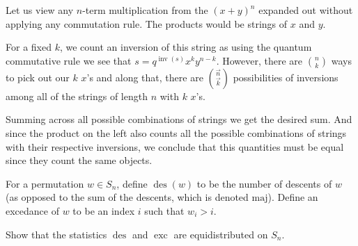 \documentclass[12pt]{memoir}
\DeclareMathOperator{\des}{des}
\DeclareMathOperator{\inv}{inv}
\DeclareMathOperator{\exc}{exc}
\begin{document}
\begin{ptcbr}
    Let us view any $n$-term multiplication from the $(x+y)^n$ expanded out without applying any commutation rule. The products would be strings of $x$ and $y$.\par
    For a fixed $k$, we count an inversion of this string as using the quantum commutative rule we see that $s=q^{\inv(s)}x^ky^{n-k}$. However, there are $\binom{n}{k}$ ways to pick out our $k$ $x$'s and along that, there are $\binom{\vec{n}}{\vec{k}}$ possibilities of inversions among all of the strings of length $n$ with $k$ $x$'s.\par 
    Summing across all possible combinations of strings we get the desired sum. And since the product on the left also counts all the possible combinations of strings with their respective inversions, we conclude that this quantities must be equal since they count the same objects.

    \iffalse
    By induction once again, when $n=1$ we get 
    $$x+y=(1)(1)y+(1)x(1)=y+x.$$
    Now let us assume that the identity is valid up to $n-1$, then 
    \begin{align*}
        (x+y)^n&=\left(\sum_{k=0}^{n-1}\binom{\vec{n-1}}{\vec k}x^ky^{(n-1)-k}\right)(x+y)\\
        &=\sum_{k=0}^{n-1}\binom{\vec{n-1}}{\vec k}x^ky^{(n-1)-k}x+\sum_{k=0}^{n-1}\binom{\vec{n-1}}{\vec k}x^ky^{n-k}.
    \end{align*}
    On the first sum, we have to use our commutation relation on $y^{(n-1)-k}x$, this is 
    $$\underbrace{yy\dots y}_{n-1-k\ \text{times}}\hspace{-0.72em}x=q\hspace{-0.72em}\underbrace{yy\dots y}_{n-2-k\ \text{times}}\hspace{-0.72em}xy=q^2\hspace{-0.72em}\underbrace{yy\dots y}_{n-3-k\ \text{times}}\hspace{-0.72em}xy^2=q^{(n-1)-k}xy^{(n-1)-k},$$
    where we have implicitly used induction on the commutation relation. We have obtained the following expression
    $$\sum_{k=0}^{n-1}\binom{\vec{n-1}}{\vec k}q^{(n-1)-k}x^{k+1}y^{(n-1)-k}+\sum_{k=0}^{n-1}\binom{\vec{n-1}}{\vec k}x^ky^{n-k}$$
\fi
\end{ptcbr}

\begin{Ej}
    For a permutation $w\in S_n$, define $\des(w)$ to be the number of descents of $w$ (as opposed to the sum of the descents, which is denoted $\text{maj}$). Define an excedance of $w$ to be an index $i$ such that $w_i>i$.\par 
    Show that the statistics $\des$ and $\exc$ are equidistributed on $S_n$.
\end{Ej}
\end{document}

